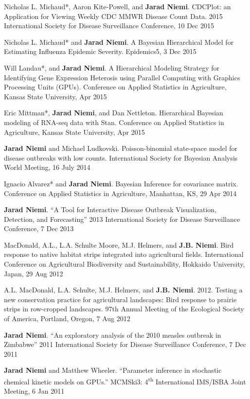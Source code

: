 \documentclass[overlapped,line]{res}
\newcommand{\sinceappt}{}
\begin{document}
\begin{resume}
{\small

Nicholas L. Michaud*, Aaron Kite-Powell, and {\bf Jarad Niemi}. CDCPlot: an Application for Viewing Weekly CDC MMWR Disease Count Data. 2015 International Society for Disease Surveillance Conference, 10 Dec 2015

Nicholas L. Michaud* and {\bf Jarad Niemi}. A Bayesian Hierarchical Model for Estimating Influenza Epidemic Severity. Epidemics5, 3 Dec 2015

Will Landau*, and {\bf Jarad Niemi}. A Hierarchical Modeling Strategy for Identifying Gene Expression Heterosis using Parallel Computing with Graphics Processing Units (GPUs). Conference on Applied Statistics in Agriculture, Kansas State University, Apr 2015

Eric Mittman*, {\bf Jarad Niemi}, and Dan Nettleton. Hierarchical Bayesian modeling of RNA-seq data with Stan. Conference on Applied Statistics in Agriculture, Kansas State University, Apr 2015

{\bf Jarad Niemi} and Michael Ludkovski. Poisson-binomial state-space model for disease outbreaks with low counts. International Society for Bayesian Analysis World Meeting, 16 July 2014 


Ignacio Alvarez* and {\bf Jarad Niemi}. Bayesian Inference for covariance matrix. Conference on Applied Statistics in Agriculture, Manhattan, KS, 29 Apr 2014 

{\bf Jarad Niemi}. ``A Tool for Interactive Disease Outbreak Visualization, Detection, and Forecasting'' 2013 International Society for Disease Surveillance Conference, 7 Dec 2013

MacDonald, A.L., L.A. Schulte Moore, M.J. Helmers, and {\bf J.B. Niemi}.  Bird response to native habitat strips integrated into agricultural fields.  International Conference on Agricultural Biodiversity and Sustainability, Hokkaido University, Japan,  29 Aug 2012 

A.L. MacDonald, L.A. Schulte, M.J. Helmers, and {\bf J.B. Niemi}.  2012.  Testing a new conservation practice for agricultural landscapes: Bird response to prairie strips in row-cropped landscapes.  97th Annual Meeting of the Ecological Society of America, Portland, Oregon, 7 Aug 2012 

\sinceappt

{\bf Jarad Niemi}. ``An exploratory analysis of the 2010 measles outbreak in Zimbabwe'' 2011 International Society for Disease Surveillance Conference, 7 Dec 2011 

{\bf Jarad Niemi} and Matthew Wheeler. ``Parameter inference in stochastic chemical kinetic models on GPUs.'' MCMSki3: 4\textsuperscript{th} International IMS/ISBA Joint Meeting, 6 Jan 2011

}
\end{resume}
\end{document}
